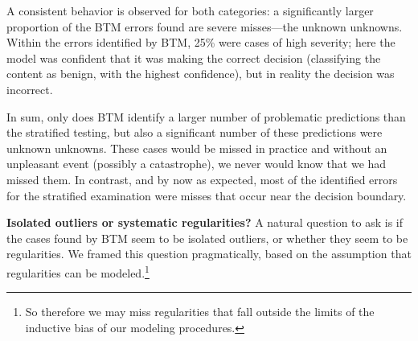 A consistent behavior is observed for both categories: a significantly larger proportion of the BTM errors found are severe misses---the unknown unknowns. Within the errors identified by BTM, 25\% were cases of high severity; here the model was confident that it was making the correct decision (classifying the content as benign, with the highest confidence), but in reality the decision was incorrect. 

In sum, only does BTM identify a larger number of problematic predictions than the stratified testing, but also a significant number of these predictions were unknown unknowns.  These cases would be missed in practice and without an unpleasant event (possibly a catastrophe), we never would know that we had missed them. In contrast, and by now as expected, most of the identified 
errors for the stratified examination were misses that occur near the decision boundary.

\begin{figure}[t]
\centering
{}
\label{fig:results}
\end{figure}


\textbf{Isolated outliers or systematic regularities?}  A natural question to ask is if the cases found by BTM seem to be isolated outliers, or whether they seem to be regularities.  We framed this question pragmatically, based on the assumption that regularities can be modeled.\footnote{So therefore we may miss regularities that fall outside the limits of the inductive bias of our modeling procedures.} 

